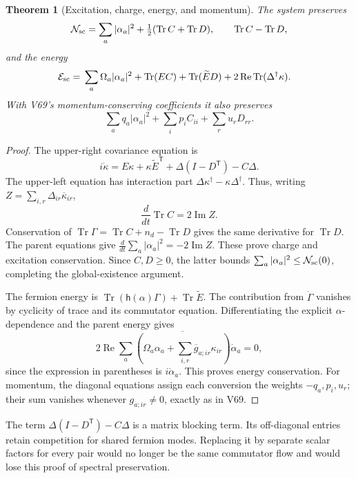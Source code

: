 \documentclass[11pt]{article}
\newtheorem{theorem}{Theorem}[section]
\theoremstyle{remark}
\begin{document}
\begin{theorem}[Excitation, charge, energy, and momentum]
\label{thm:v20v71-conservation}
The system preserves
\[
 \mathcal N_{\rm sc}=\sum_a|\alpha_a|^2+
                          \tfrac12(\operatorname{Tr}C+\operatorname{Tr}D),
 \qquad \operatorname{Tr}C-\operatorname{Tr}D,
\]
and the energy
\[
 \begin{split}
 \mathcal E_{\rm sc}={}&\sum_a\Omega_a|\alpha_a|^2+
            \operatorname{Tr}(EC)+\operatorname{Tr}(\widetilde E D)
                +2\operatorname{Re}\operatorname{Tr}(\Delta^\dagger\kappa).
 \end{split}
\]
With V69's momentum-conserving coefficients it also
preserves
\[
 \sum_aq_a|\alpha_a|^2+\sum_ip_iC_{ii}+\sum_ru_rD_{rr}.
\]
\end{theorem}
\begin{proof}
The upper-right covariance equation is
\[
 i\dot\kappa=E\kappa+\kappa\widetilde E^{\mathsf T}
                   +\Delta(I-D^{\mathsf T})-C\Delta .
\]
The upper-left equation has interaction part
\(\Delta\kappa^\dagger-\kappa\Delta^\dagger\).
Thus, writing \(Z=\sum_{i,r}\Delta_{ir}\overline\kappa_{ir}\),
\[
 \frac d{dt}\operatorname{Tr}C=2\operatorname{Im}Z.
\]
Conservation of \(\operatorname{Tr}\Gamma
=\operatorname{Tr}C+n_d-\operatorname{Tr}D\)
gives the same derivative for \(\operatorname{Tr}D\).
The parent equations give
\(\frac d{dt}\sum_a|\alpha_a|^2=-2\operatorname{Im}Z\).
These prove charge and excitation conservation.
Since \(C,D\geq0\), the latter bounds
\(\sum_a|\alpha_a|^2\leq\mathcal N_{\rm sc}(0)\),
completing the global-existence argument.

The fermion energy is
\(\operatorname{Tr}(\mathsf h(\alpha)\Gamma)
+\operatorname{Tr}\widetilde E\).
The contribution from \(\dot\Gamma\) vanishes by
cyclicity of trace and its commutator equation.
Differentiating the explicit \(\alpha\)-dependence
and the parent energy gives
\[
 2\operatorname{Re}\sum_a
 \overline{\left(\Omega_a\alpha_a+
                 \sum_{i,r}\overline g_{a;ir}\kappa_{ir}\right)}
                                                      \dot\alpha_a=0,
\]
since the expression in parentheses is \(i\dot\alpha_a\).
This proves energy conservation.
For momentum, the diagonal equations assign each
conversion the weights \(-q_a,p_i,u_r\); their sum
vanishes whenever \(g_{a;ir}\ne0\), exactly as in V69.
\end{proof}

The term \(\Delta(I-D^{\mathsf T})-C\Delta\) is a
matrix blocking term.  Its off-diagonal entries
retain competition for shared fermion modes.
Replacing it by separate scalar factors for every
pair would no longer be the same commutator flow
and would lose this proof of spectral preservation.
\end{document}
